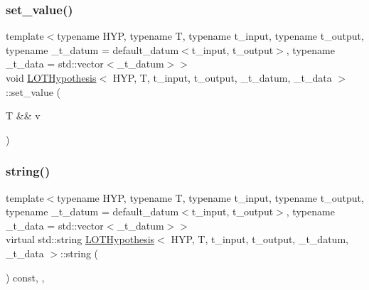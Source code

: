 \mbox{\label{class_l_o_t_hypothesis_ac07e0957d2e586f2cc84821795d5c462}} 
\subsubsection{\texorpdfstring{set\+\_\+value()}{set\_value()}\hspace{0.1cm}{\footnotesize\ttfamily [2/2]}}
{\footnotesize\ttfamily template$<$typename H\+YP, typename T, typename t\+\_\+input, typename t\+\_\+output, typename \+\_\+t\+\_\+datum = default\+\_\+datum$<$t\+\_\+input, t\+\_\+output$>$, typename \+\_\+t\+\_\+data = std\+::vector$<$\+\_\+t\+\_\+datum$>$$>$ \\
void \hyperlink{class_l_o_t_hypothesis}{L\+O\+T\+Hypothesis}$<$ H\+YP, T, t\+\_\+input, t\+\_\+output, \+\_\+t\+\_\+datum, \+\_\+t\+\_\+data $>$\+::set\+\_\+value (\begin{DoxyParamCaption}\item[{T \&\&}]{v }\end{DoxyParamCaption})\hspace{0.3cm}{\ttfamily [inline]}}

\mbox{\label{class_l_o_t_hypothesis_a5c91fd3b7ef4ebc585413d723cd17e7e}} 
\subsubsection{\texorpdfstring{string()}{string()}}
{\footnotesize\ttfamily template$<$typename H\+YP, typename T, typename t\+\_\+input, typename t\+\_\+output, typename \+\_\+t\+\_\+datum = default\+\_\+datum$<$t\+\_\+input, t\+\_\+output$>$, typename \+\_\+t\+\_\+data = std\+::vector$<$\+\_\+t\+\_\+datum$>$$>$ \\
virtual std\+::string \hyperlink{class_l_o_t_hypothesis}{L\+O\+T\+Hypothesis}$<$ H\+YP, T, t\+\_\+input, t\+\_\+output, \+\_\+t\+\_\+datum, \+\_\+t\+\_\+data $>$\+::string (\begin{DoxyParamCaption}{ }\end{DoxyParamCaption}) const\hspace{0.3cm}{\ttfamily [inline]}, {\ttfamily [override]}, {\ttfamily [virtual]}}




